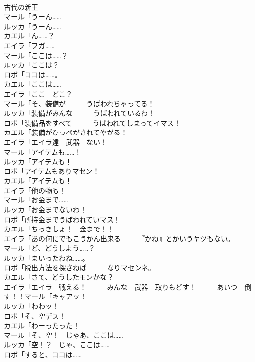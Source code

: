 \documentclass[8pt]{extreport}
\begin{document}
\begin{CJK}{UTF8}{min}
\\	古代の新王	
\\	マール「うーん……	
\\	ルッカ「うーん……	
\\	カエル「ん……？	
\\	エイラ「フガ……	
\\	マール「ここは……？	
\\	ルッカ「ここは？	
\\	ロボ「ココは……。	
\\	カエル「ここは……	
\\	エイラ「ここ　どこ？	
\\	マール「そ、装備が　　　うばわれちゃってる！	
\\	ルッカ「装備がみんな　　　うばわれているわ！	
\\	ロボ「装備品をすべて　　　うばわれてしまってイマス！	
\\	カエル「装備がひっぺがされてやがる！	
\\	エイラ「エイラ達　武器　ない！	
\\	マール「アイテムも……！	
\\	ルッカ「アイテムも！	
\\	ロボ「アイテムもありマセン！	
\\	カエル「アイテムも！	
\\	エイラ「他の物も！	
\\	マール「お金まで……	
\\	ルッカ「お金までないわ！	
\\	ロボ「所持金までうばわれていマス！	
\\	カエル「ちっきしょ！　金まで！！	
\\	エイラ「あの何にでもこうかん出来る　　　『かね』とかいうヤツもない。	
\\	マール「ど、どうしよう……？	
\\	ルッカ「まいったわね……。	
\\	ロボ「脱出方法を探さねば　　　なりマセンネ。	
\\	カエル「さて、どうしたモンかな？	
\\	エイラ「エイラ　戦える！　　　みんな　武器　取りもどす！　　　あいつ　倒す！！マール「キャアッ！	
\\	ルッカ「わわッ！	
\\	ロボ「そ、空デス！	
\\	カエル「わーったった！	
\\	マール「そ、空！　じゃあ、ここは……	
\\	ルッカ「空！？　じゃ、ここは……	
\\	ロボ「すると、ココは……	

\end{CJK}
\end{document}
